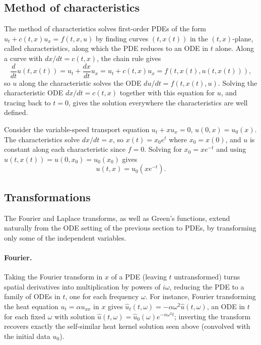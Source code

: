 \subsection{Method of characteristics}

The method of characteristics solves first-order PDEs of the form
$u_t + c(t,x) u_x = f(t,x,u)$ by finding curves $(t,x(t))$ in the
$(t,x)$-plane, called characteristics, along which the PDE reduces to
an ODE in $t$ alone. Along a curve with $dx/dt = c(t,x)$, the chain
rule gives
\begin{equation*}
    \frac{d}{dt} u(t,x(t)) = u_t + \frac{dx}{dt} u_x = u_t + c(t,x) u_x
    = f(t,x(t),u(t,x(t))),
\end{equation*}
so $u$ along the characteristic solves the ODE $du/dt =
f(t,x(t),u)$. Solving the characteristic ODE $dx/dt = c(t,x)$ together
with this equation for $u$, and tracing back to $t=0$, gives the
solution everywhere the characteristics are well defined.

\begin{example}
    Consider the variable-speed transport equation $u_t + xu_x = 0$,
    $u(0,x) = u_0(x)$. The characteristics solve $dx/dt = x$, so $x(t)
    = x_0 e^t$ where $x_0 = x(0)$, and $u$ is constant along each
    characteristic since $f=0$. Solving for $x_0 = xe^{-t}$ and using
    $u(t,x(t)) = u(0,x_0) = u_0(x_0)$ gives
    \begin{equation*}
        u(t,x) = u_0(xe^{-t}).
    \end{equation*}
\end{example}

\subsection{Transformations}

The Fourier and Laplace transforms, as well as Green's functions,
extend naturally from the ODE setting of the previous section to PDEs,
by transforming only some of the independent variables.

\paragraph{Fourier.}
Taking the Fourier transform in $x$ of a PDE (leaving $t$
untransformed) turns spatial derivatives into multiplication by powers
of $i\omega$, reducing the PDE to a family of ODEs in $t$, one for each
frequency $\omega$. For instance, Fourier transforming the heat
equation $u_t = \alpha u_{xx}$ in $x$ gives $\hat u_t(t,\omega) =
-\alpha \omega^2 \hat u(t,\omega)$, an ODE in $t$ for each fixed
$\omega$ with solution $\hat u(t,\omega) = \hat u_0(\omega)
e^{-\alpha\omega^2 t}$; inverting the transform recovers exactly the
self-similar heat kernel solution seen above (convolved with the
initial data $u_0$).

